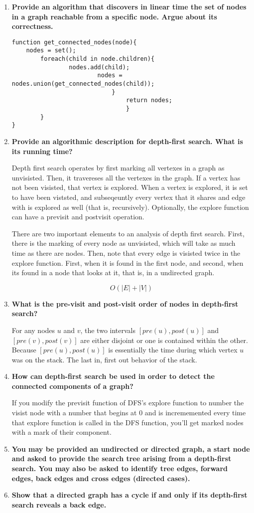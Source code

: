 \documentclass[a4paper,11pt]{article}
\begin{document}
\begin{enumerate}
\def\labelenumi{\arabic{enumi}.}
\item
  \textbf{Provide an algorithm that discovers in linear time the set of
  nodes in a graph reachable from a specific node. Argue about its
  correctness.}

\begin{verbatim}
function get_connected_nodes(node){
    nodes = set();
        foreach(child in node.children){
                nodes.add(child);
                        nodes = nodes.union(get_connected_nodes(child));
                            }
                                return nodes;
                                }
        }
}
\end{verbatim}
\item
  \textbf{Provide an algorithmic description for depth-first search.
  What is its running time?}

  Depth first search operates by first marking all vertexes in a graph
  as unvisisted. Then, it travereses all the vertexes in the graph. If a
  vertex has not been visisted, that vertex is explored. When a vertex
  is explored, it is set to have been viststed, and subseqeuntly every
  vertex that it shares and edge with is explored as well (that is,
  recursively). Optionally, the explore function can have a previsit and
  postvisit operation.

  There are two important elements to an analysis of depth first search.
  First, there is the marking of every node as unvisisted, which will
  take as much time as there are nodes. Then, note that every edge is
  visisted twice in the explore function. First, when it is found in the
  first node, and second, when its found in a node that looks at it,
  that is, in a undirected graph.

  \[O(|E| + |V|)\]
\item
  \textbf{What is the pre-visit and post-visit order of nodes in
  depth-first search?}

  For any nodes $u$ and $v$, the two intervals $[pre(u), post(u)]$ and
  $[pre(v), post(v)]$ are either disjoint or one is contained within the
  other. Because $[pre(u), post(u)]$ is essentially the time during
  which vertex $u$ was on the stack. The last in, first out behavior of
  the stack.
\item
  \textbf{How can depth-first search be used in order to detect the
  connected components of a graph?}

  If you modify the previsit function of DFS's explore function to
  number the visist node with a number that begins at 0 and is
  incrememented every time that explore function is called in the DFS
  function, you'll get marked nodes with a mark of their component.
\item
  \textbf{You may be provided an undirected or directed graph, a start
  node and asked to provide the search tree arising from a depth-first
  search. You may also be asked to identify tree edges, forward edges,
  back edges and cross edges (directed cases).}
\item
  \textbf{Show that a directed graph has a cycle if and only if its
  depth-first search reveals a back edge.}


\end{enumerate}
\end{document}
